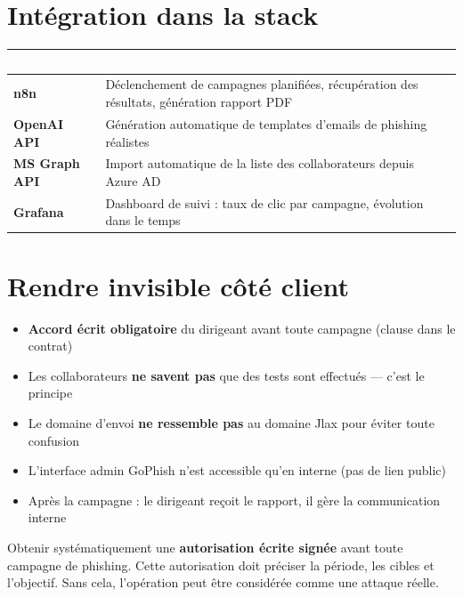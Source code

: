 \documentclass[11pt, a4paper]{article}
\begin{document}
\section{Intégration dans la stack}

\begin{center}
\renewcommand{\arraystretch}{1.4}
\begin{tabularx}{\linewidth}{>{\bfseries}p{2.8cm} X}
\toprule
\rowcolor{tabheader}
\textcolor{white}{\textbf{Outil}} & \textcolor{white}{\textbf{Rôle}} \\
\midrule
n8n & Déclenchement de campagnes planifiées, récupération des résultats, génération rapport PDF \\
\rowcolor{rowgray}
OpenAI API & Génération automatique de templates d'emails de phishing réalistes \\
MS Graph API & Import automatique de la liste des collaborateurs depuis Azure AD \\
\rowcolor{rowgray}
Grafana & Dashboard de suivi : taux de clic par campagne, évolution dans le temps \\
\bottomrule
\end{tabularx}
\end{center}

\section{Rendre invisible côté client}

\begin{itemize}
  \item \textbf{Accord écrit obligatoire} du dirigeant avant toute campagne (clause dans le contrat)
  \item Les collaborateurs \textbf{ne savent pas} que des tests sont effectués — c'est le principe
  \item Le domaine d'envoi \textbf{ne ressemble pas} au domaine Jlax pour éviter toute confusion
  \item L'interface admin GoPhish n'est accessible qu'en interne (pas de lien public)
  \item Après la campagne : le dirigeant reçoit le rapport, il gère la communication interne
\end{itemize}

\begin{attention}
  Obtenir systématiquement une \textbf{autorisation écrite signée} avant toute campagne de phishing. Cette autorisation doit préciser la période, les cibles et l'objectif. Sans cela, l'opération peut être considérée comme une attaque réelle.
\end{attention}
\end{document}
